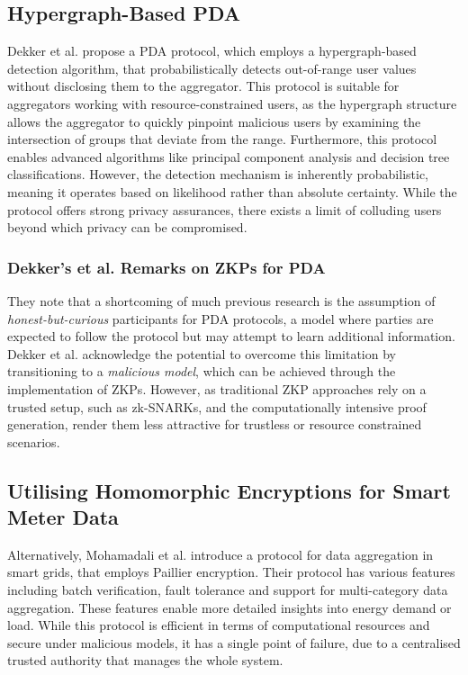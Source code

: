 \subsection{Hypergraph-Based PDA}
Dekker et al. \cite{PDA} propose a PDA protocol, which employs a hypergraph-based detection algorithm, that probabilistically detects out-of-range user values without disclosing them to the aggregator. This protocol is suitable for aggregators working with resource-constrained users, as the hypergraph structure allows the aggregator to quickly pinpoint malicious users by examining the intersection of groups that deviate from the range. Furthermore, this protocol enables advanced algorithms like principal component analysis and decision tree classifications. However, the detection mechanism is inherently probabilistic, meaning it operates based on likelihood rather than absolute certainty. While the protocol offers strong privacy assurances, there exists a limit of colluding users beyond which privacy can be compromised.

\subsubsection{Dekker's et al. \cite{PDA} Remarks on ZKPs for PDA\label{sec:malicious}}

They note that a shortcoming of much previous research is the assumption of \textit{honest-but-curious} participants for PDA protocols, a model where parties are expected to follow the protocol but may attempt to learn additional information. Dekker et al. acknowledge the potential to overcome this limitation by transitioning to a \textit{malicious model}, which can be achieved through the implementation of ZKPs. However, as traditional ZKP approaches rely on a trusted setup, such as zk-SNARKs, and the computationally intensive proof generation, render them less attractive for trustless or resource constrained scenarios. 

\subsection{Utilising Homomorphic Encryptions for Smart Meter Data\label{sec:homo}}

Alternatively, Mohamadali et al. \cite{nhp3} introduce a protocol for data aggregation in smart grids, that employs Paillier encryption. Their protocol has various features including batch verification, fault tolerance and support for multi-category data aggregation. These features enable more detailed insights into energy demand or load. While this protocol is efficient in terms of computational resources and secure under malicious models, it has a single point of failure, due to a centralised trusted authority that manages the whole system.

